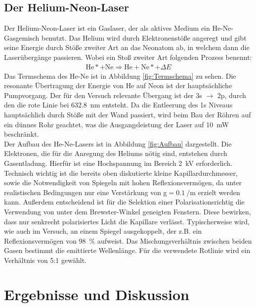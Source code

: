 \documentclass[a4paper,twoside,final]{article}
\begin{document}
\subsection{Der Helium-Neon-Laser}
Der Helium-Neon-Laser ist ein Gaslaser, der als aktives Medium ein He-Ne-Gasgemisch benutzt. Das Helium wird durch Elektronenstöße angeregt und gibt seine Energie durch Stöße zweiter Art an das Neonatom ab, in welchem dann die Laserübergänge passieren. Wobei ein Stoß zweiter Art folgenden Prozess benennt:
\begin{align}
  \text{He}* + \text{Ne} \Rightarrow \text{He}+\text{Ne}*+\Delta E
\end{align}
Das Termschema des He-Ne ist in Abbildung \ref{fig:Termschema} zu sehen.
Die resonante Übertragung der Energie von He auf Neon ist der hauptsächliche Pumpvorgang. Der für den Versuch relevante Übergang ist der 3s $\rightarrow$ 2p, durch den die rote Linie bei \SI{632,8}{\nano\meter} entsteht. Da die Entleerung des 1s Niveaus hauptsächlich durch Stöße mit der Wand passiert, wird beim Bau der Röhren auf ein dünnes Rohr geachtet, was die Ausgangsleistung der Laser auf \SI{10}{\milli\watt} beschränkt. \\
Der Aufbau des He-Ne-Lasers ist in Abbildung \ref{fig:Aufbau} dargestellt. Die Elektronen, die für die Anregung des Heliums nötig sind, entstehen durch Gasentladung. Hierfür ist eine Hochspannung im Bereich \SI{2}{\kilo\volt} erforderlich. Technisch wichtig ist die bereits oben diskutierte kleine Kapillardurchmesser, sowie die Notwendigkeit von Spiegeln mit hohen Reflexionsvermögen, da unter realistischen Bedingungen nur eine Verstärkung von g$=\SI{0,1}{\per\meter}$ erzielt werden kann. Außerdem entscheidend ist für die Selektion einer Polarisationsrichtig die Verwendung von unter dem Brewster-Winkel geneigten Fenstern. Diese bewirken, dass nur senkrecht polarisiertes Licht die Kapillare verlässt. Typischerweise wird, wie auch im Versuch, an einem Spiegel ausgekoppelt, der z.B. ein Reflexionsvermögen von \SI{98}{\percent} aufweist. Das Mischungsverhältnis zwischen beiden Gasen bestimmt die emittierte Wellenlänge. Für die verwendete Rotlinie wird ein Verhältnis von 5:1 gewählt.

\newpage
\section{Ergebnisse und Diskussion}\label{sec:ErgebnisseUndDiskussion}
\end{document}
